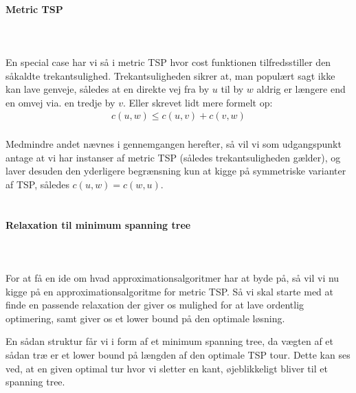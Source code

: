 \paragraph{Metric TSP}
~\\
~\\
En special case har vi så i metric TSP hvor cost funktionen tilfredsstiller den såkaldte trekantsulighed. Trekantsuligheden sikrer at, man populært sagt ikke kan lave genveje, således at en direkte vej fra by $u$ til by $w$ aldrig er længere end en omvej via. en tredje by $v$. Eller skrevet lidt mere formelt op:
\begin{align*}
 c(u,w) \leq c(u,v) + c(v,w)
\end{align*}
~\\
Medmindre andet nævnes i gennemgangen herefter, så vil vi som udgangspunkt antage at vi har instanser af metric TSP (således trekantsuligheden gælder), og laver desuden den yderligere begrænsning kun at kigge på symmetriske varianter af TSP, således $c(u,w) = c(w,u)$.\\
~\\

\paragraph{Relaxation til minimum spanning tree}
~\\
~\\
For at få en ide om hvad approximationsalgoritmer har at byde på, så vil vi nu kigge på en approximationsalgoritme for metric TSP. Så vi skal starte med at finde en passende relaxation der giver os mulighed for at lave ordentlig optimering, samt giver os et lower bound på den optimale løsning.

En sådan struktur får vi i form af et minimum spanning tree, da vægten af et sådan træ er et lower bound på længden af den optimale TSP tour. Dette kan ses ved, at en given optimal tur hvor vi sletter en kant, øjeblikkeligt bliver til et spanning tree.

